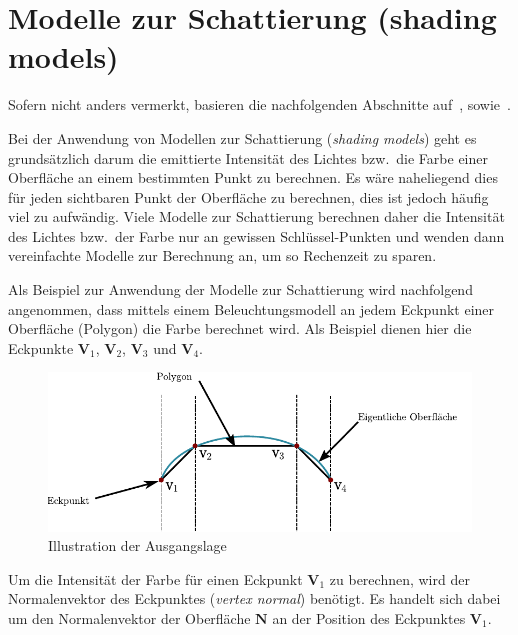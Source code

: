
\section{Modelle zur Schattierung (shading models)}
\label{sec:shading}

Sofern nicht anders vermerkt, basieren die nachfolgenden Abschnitte
auf~\cite[S. 734–739]{foley_computer_1996}, sowie~\cite{hughes_computer_2013}.

Bei der Anwendung von Modellen zur Schattierung (\textit{shading
    models}) geht es grundsätzlich darum die emittierte Intensität des
Lichtes bzw.\ die Farbe einer Oberfläche an einem bestimmten Punkt zu
berechnen. Es wäre naheliegend dies für jeden sichtbaren Punkt der
Oberfläche zu berechnen, dies ist jedoch häufig viel zu aufwändig. Viele
Modelle zur Schattierung berechnen daher die Intensität des Lichtes
bzw.\ der Farbe nur an gewissen Schlüssel-Punkten und wenden dann
vereinfachte Modelle zur Berechnung an, um so Rechenzeit zu sparen.

Als Beispiel zur Anwendung der Modelle zur Schattierung wird nachfolgend
angenommen, dass mittels einem Beleuchtungsmodell an jedem Eckpunkt einer
Oberfläche (Polygon) die Farbe berechnet wird. Als Beispiel dienen hier die
Eckpunkte $\bm{V}_{1}$, $\bm{V}_{2}$, $\bm{V}_{3}$ und $\bm{V}_{4}$.

\begin{figure}[H]
    \centering
    \includegraphics{img/shading_mesh.pdf}
    \caption{Illustration der Ausgangslage\protect\footnotemark}\label{
        fig:shading_mesh_illustration}
\end{figure}

Um die Intensität der Farbe für einen Eckpunkt $\bm{V}_{1}$ zu
berechnen, wird der Normalenvektor des Eckpunktes (\textit{vertex
    normal}) benötigt. Es handelt sich dabei um den Normalenvektor der
Oberfläche $\bm{N}$ an der Position des Eckpunktes $\bm{V}_{1}$.

